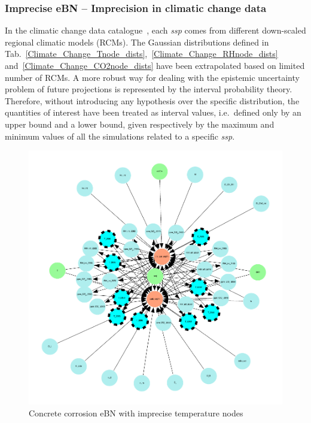 \subsubsection{Imprecise eBN -- Imprecision in climatic change data}

In the climatic change data catalogue~\cite{Copernicus_Climate_Change}, each \textit{ssp} comes from different down-scaled regional climatic models (RCMs). The Gaussian distributions defined in Tab.~\ref{Climate_Change_Tnode_dists},~\ref{Climate_Change_RHnode_dists} and~\ref{Climate_Change_CO2node_dists} have been extrapolated based on limited number of RCMs.
A more robust way for dealing with the epistemic uncertainty problem of future projections is represented by the interval probability theory. Therefore, without introducing any hypothesis over the specific distribution, the quantities of interest have been treated as interval values, i.e.~defined only by an upper bound and a lower bound, given respectively by the maximum and minimum values of all the simulations related to a specific \textit{ssp}.

\begin{figure}[H]
    \centering
    \includegraphics[width=\linewidth]{imgs/pdfs/14_total_ebn_imprecise.pdf}
    \caption{Concrete corrosion eBN with imprecise temperature nodes}\label{fig:imprecise_ebn}
\end{figure}

